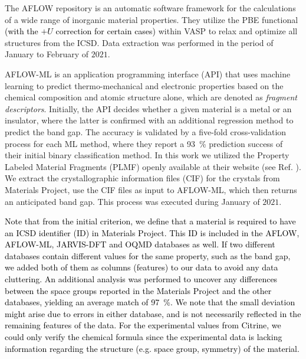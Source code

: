 \documentclass[superscriptaddress,unsortedaddress,
 amsmath,amssymb,
 aps,
]{revtex4-2}
\newcommand{\mrk}[1]{\textcolor{black}{#1}}
\begin{document}
The AFLOW \cite{Curtarolo2012, Curtarolo2012a, Calderon2015} repository is an automatic software framework for the calculations of a wide range of inorganic material properties. They utilize the PBE functional \mrk{(with the $+U$ correction for certain cases)} within VASP to relax and optimize all structures from the ICSD. Data extraction was performed in the period of January to February of $2021$.

AFLOW-ML \cite{Isayev2017} is an application programming interface (API) that uses machine learning to predict thermo-mechanical and electronic properties based on the chemical composition and atomic structure alone, which are denoted as \textit{fragment descriptors}. Initially, the API decides whether a given material is a metal or an insulator, where the latter is confirmed with an additional regression method to predict the band gap. The accuracy is validated by a five-fold cross-validation process for each ML method, where they report a \SI{93}{\percent} prediction success of their initial binary classification method. In this work we utilized the Property Labeled Material Fragments (PLMF) openly available at their website 
(see Ref. \cite{Isayev2017}). 
We extract the crystallographic information files (CIF) for the crystals from Materials Project, use the CIF files as input to AFLOW-ML, which then returns an anticipated band gap. This process was executed during January of $2021$. 

\mrk{Note that from the initial criterion, we define that a material is required to have an ICSD identifier (ID) in Materials Project. This ID is included in the AFLOW,  AFLOW-ML, JARVIS-DFT and OQMD databases as well. If two different databases contain different values for the same property, such as the band gap, we added both of them as columns (features) to our data to avoid any data cluttering. An additional analysis was performed to uncover any differences between the space groups reported in the Materials Project and the other databases, yielding an average match of \SI{97}{\percent}. We note that the small deviation might arise due to errors in either database, and is not necessarily reflected in the remaining features of the data. For the experimental values from Citrine, we could only verify the chemical formula since the experimental data is lacking information regarding the structure (e.g. space group, symmetry) of the material.}
\end{document}
